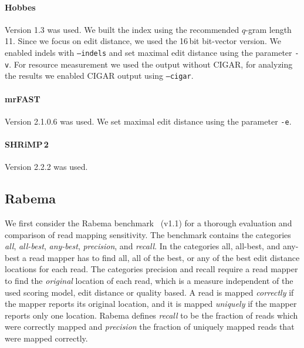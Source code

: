 \paragraph{Hobbes}
Version 1.3 was used.
We built the index using the recommended
$q$-gram length 11.
Since we focus on edit distance, we used the 16\,bit bit-vector version.%
We enabled indels with \texttt{--indels} and set maximal edit distance using the parameter \texttt{-v}.
For resource measurement we used the output without CIGAR, for analyzing the results we enabled CIGAR output using \texttt{--cigar}.

\paragraph{mrFAST}
Version 2.1.0.6 was used.
We set maximal edit distance using the parameter \texttt{-e}.

\paragraph{SHRiMP\,2}
Version 2.2.2 was used.

\subsection{Rabema}

We first consider the Rabema benchmark~\citep{Holtgrewe2011} (v1.1) for a thorough evaluation and comparison of read mapping sensitivity.
The benchmark contains the categories \emph{all}, \emph{all-best}, \emph{any-best}, \emph{precision}, and \emph{recall}.
In the categories all, all-best, and any-best a read mapper has to find all, all of the best, or any of the best edit distance locations for each read.
The categories precision and recall require a read mapper to find the \emph{original} location of each read, which is a measure independent of the used scoring model, \eg edit distance or quality based.
A read is mapped \emph{correctly} if the mapper reports its original location, 
and it is mapped \emph{uniquely} if the mapper reports only one location.
Rabema defines \emph{recall} to be the fraction of reads which were correctly mapped and \emph{precision} the fraction of uniquely mapped reads that were mapped correctly.

